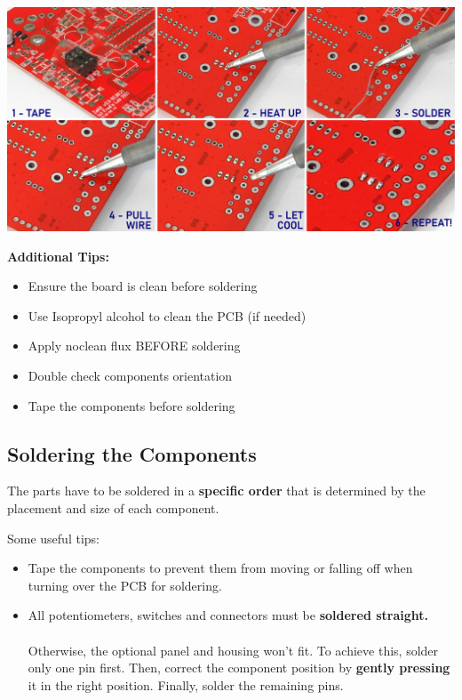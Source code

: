 \documentclass{scrartcl}
\begin{document}
\vspace{0.25cm}
\begin{center}
    \includegraphics[scale=0.65]{assets/solder-strip.jpg}
\end{center}

\pagebreak
\textbf{Additional Tips:}

\begin{itemize}
    \item Ensure the board is clean before soldering
    \item Use Isopropyl alcohol to clean the PCB (if needed)
    \item Apply noclean flux BEFORE soldering
    \item Double check components orientation
    \item Tape the components before soldering
\end{itemize}

\pagebreak
\subsection{Soldering the Components}

The parts have to be soldered in a \textbf{specific order} that is determined by the placement and size of each component.

Some useful tips:

\begin{itemize}
    \item Tape the components to prevent them from moving or falling off when turning over the PCB for soldering.
    \item All potentiometers, switches and connectors must be \textbf{soldered straight.} \\\\
    Otherwise, the optional panel and housing won't fit. To achieve this, solder only one pin first. Then, correct the component position by \textbf{gently pressing} it in the right position. Finally, solder the remaining pins.
\end{itemize}
\end{document}
